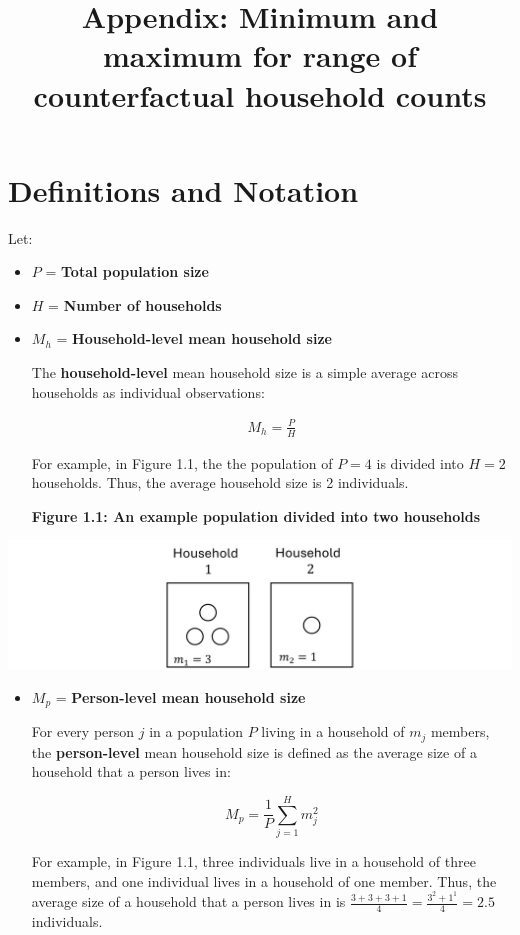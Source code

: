 \documentclass[
]{article}
\title{Appendix: Minimum and maximum for range of counterfactual
household counts}
\author{}
\date{\vspace{-2.5em}}
\begin{document}
\maketitle

\hypertarget{definitions-and-notation}{%
\section{Definitions and Notation}\label{definitions-and-notation}}

Let:

\begin{itemize}
\item
  \(P\) = \textbf{Total population size}
\item
  \(H\) = \textbf{Number of households}
\item
  \(M_h\) = \textbf{Household-level mean household size}

  The \textbf{household-level} mean household size is a simple average
  across households as individual observations:

  \begin{align}
    \label{eq:2}
    \tag{2}
    M_h = \frac{P}{H}
    \end{align}

  For example, in Figure 1.1, the the population of \(P = 4\) is divided
  into \(H = 2\) households. Thus, the average household size is 2
  individuals.

  \textbf{Figure 1.1: An example population divided into two households}
\end{itemize}

\includegraphics[width=1\linewidth]{proof_files/figure1-1}

\begin{itemize}
\item
  \(M_p\) = \textbf{Person-level mean household size}

  For every person \(j\) in a population \(P\) living in a household of
  \(m_j\) members, the \textbf{person-level} mean household size is
  defined as the average size of a household that a person lives in:

  \begin{equation}
    \label{eq:1}
    \tag{1}
    M_p = \frac{1}{P} \sum_{j = 1}^H m_j^2
    \end{equation}

  For example, in Figure 1.1, three individuals live in a household of
  three members, and one individual lives in a household of one member.
  Thus, the average size of a household that a person lives in is
  \(\frac{3 + 3 + 3 + 1}{4} = \frac{3^2 + 1^1}{4} = 2.5\) individuals.
\end{itemize}
\end{document}
